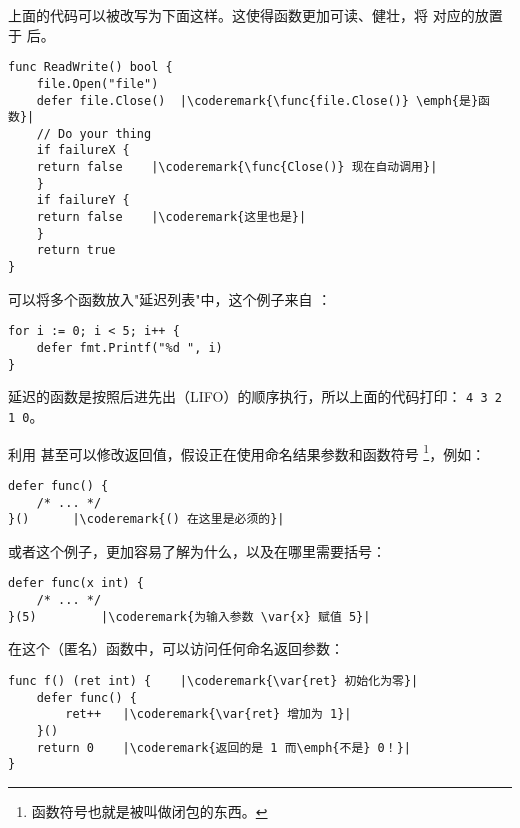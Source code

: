 上面的代码可以被改写为下面这样。这使得函数更加可读、健壮，将
 对应的放置于  后。
\begin{lstlisting}[caption=With defer]
func ReadWrite() bool {
    file.Open("file")
    defer file.Close()	|\coderemark{\func{file.Close()} \emph{是}函数}|
    // Do your thing
    if failureX {
	return false    |\coderemark{\func{Close()} 现在自动调用}|
    }
    if failureY {
	return false    |\coderemark{这里也是}|
    }
    return true
}
\end{lstlisting}

可以将多个函数放入"延迟列表"中，这个例子来自 \cite{effective_go}：
\begin{lstlisting}
for i := 0; i < 5; i++ { 
    defer fmt.Printf("%d ", i) 
} 
\end{lstlisting}
延迟的函数是按照后进先出（LIFO）的顺序执行，所以上面的代码打印：
\lstinline{4 3 2 1 0}。

利用  甚至可以修改返回值，假设正在使用命名结果参数和函数符号
\footnote{函数符号也就是被叫做闭包的东西。}，例如：
\begin{lstlisting}[caption=函数符号]
defer func() {
	/* ... */
}()		 |\coderemark{() 在这里是必须的}|
\end{lstlisting}
或者这个例子，更加容易了解为什么，以及在哪里需要括号：
\begin{lstlisting}[caption=带参数的函数符号]
defer func(x int) {
	/* ... */
}(5)		 |\coderemark{为输入参数 \var{x} 赋值 5}|
\end{lstlisting}
在这个（匿名）函数中，可以访问任何命名返回参数：
\begin{lstlisting}[caption=在 defer 中访问返回值]
func f() (ret int) {    |\coderemark{\var{ret} 初始化为零}|
	defer func() {
		ret++	|\coderemark{\var{ret} 增加为 1}|
	}()
	return 0	|\coderemark{返回的是 1 而\emph{不是} 0！}|
}
\end{lstlisting}

